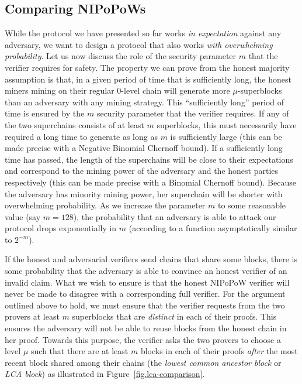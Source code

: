 \subsection{Comparing NIPoPoWs}
While the protocol we have presented so far works \emph{in expectation} against
any adversary, we want to design a protocol that also works \emph{with
overwhelming probability}.  Let us now discuss the role of the security
parameter $m$ that the verifier requires for safety. The property we can prove
from the honest majority assumption is that, in a given period of time that is
sufficiently long, the honest miners mining on their regular $0$-level chain
will generate more $\mu$-superblocks than an adversary with any mining strategy.
This ``sufficiently long'' period of time is ensured by the $m$ security
parameter that the verifier requires. If any of the two superchains consists of
at least $m$ superblocks, this must necessarily have required a long time to
generate as long as $m$ is sufficiently large (this can be
made precise with a Negative Binomial Chernoff bound). If a sufficiently long
time has passed, the length of the superchains will be close to their
expectations and correspond to the mining power of the adversary and the honest
parties respectively (this can be made precise with a Binomial Chernoff
bound). Because the adversary has minority mining power, her superchain will
be shorter with overwhelming probability. As we increase the parameter $m$ to
some reasonable value (say $m = 128$), the probability that an adversary is able
to attack our protocol drops exponentially in $m$ (according to a function
asymptotically similar to $2^{-m}$).

If the honest and adversarial verifiers send chains that share some blocks,
there is some probability that the adversary is able to convince an honest
verifier of an invalid claim. What we wish to ensure is that the honest NIPoPoW
verifier will never be made to disagree with a corresponding full verifier. For
the argument outlined above to hold, we must ensure that the verifier requests
from the two provers at least $m$ superblocks that are \emph{distinct} in each
of their proofs. This ensures the adversary will not be able to reuse blocks
from the honest chain in her proof. Towards this purpose, the verifier asks the
two provers to choose a level $\mu$ such that there are at least $m$ blocks in
each of their proofs \emph{after} the most recent block shared among their
chains (the \emph{lowest common ancestor block} or \emph{LCA block}) as
illustrated in Figure~\ref{fig.lca-comparison}.

